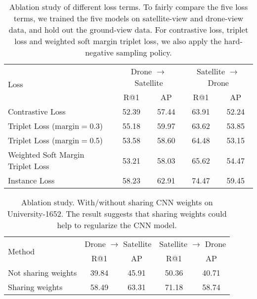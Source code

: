 \documentclass[sigconf]{acmart}
\begin{document}
\setlength{\tabcolsep}{1pt}
\begin{table}
\small
\begin{center}
\begin{tabular}{l|cc|cc}
\hline
\multirow{2}{*}{Loss} & \multicolumn{2}{c|}{Drone $\rightarrow$ Satellite} & \multicolumn{2}{c}{Satellite $\rightarrow$ Drone}\\
  & R@1 & AP & R@1 & AP\\
\shline
Contrastive Loss & 52.39 & 57.44 & 63.91 & 52.24\\
Triplet Loss (margin$=$0.3)  & 55.18 & 59.97 & 63.62 & 53.85 \\
Triplet Loss (margin$=$0.5)  & 53.58 & 58.60 & 64.48 & 53.15 \\
Weighted Soft Margin Triplet Loss & 53.21 & 58.03 & 65.62 & 54.47\\
Instance Loss & 58.23 & 62.91 & 74.47 & 59.45 \\
\hline
\end{tabular}
\end{center}
\caption{Ablation study of different loss terms. To fairly compare the five loss terms, we trained the five models on satellite-view and drone-view data, and hold out the ground-view data. For contrastive loss, triplet loss and weighted soft margin triplet loss, we also apply the hard-negative sampling policy.
}
\label{table:loss}
\end{table}

\setlength{\tabcolsep}{9pt}
\begin{table}
\small
\begin{center}
\begin{tabular}{l|cc|cc}
\hline
\multirow{2}{*}{Method} & \multicolumn{2}{c|}{Drone $\rightarrow$ Satellite} & \multicolumn{2}{c}{Satellite $\rightarrow$ Drone}\\
  & R@1 & AP & R@1 & AP\\
\shline
Not sharing weights  & 39.84 & 45.91 & 50.36 & 40.71 \\
Sharing weights & 58.49 & 63.31 & 71.18 & 58.74 \\
\hline
\end{tabular}
\end{center}
\caption{Ablation study. With/without sharing CNN weights on University-1652. The result suggests that sharing weights could help to regularize the CNN model. }
\label{table:Share}
\end{table}
\end{document}
